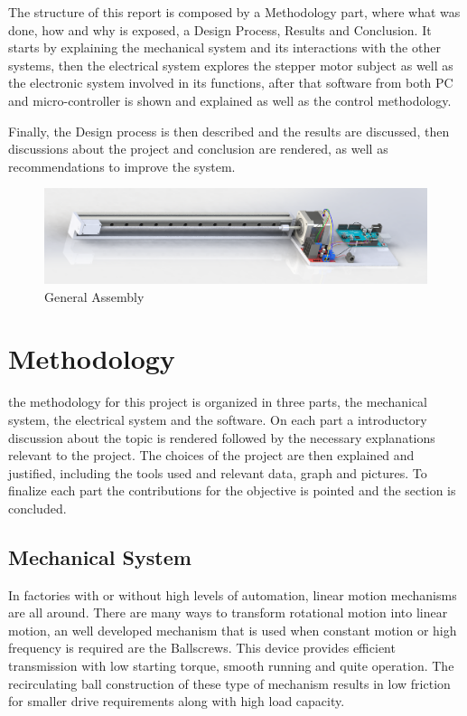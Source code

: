 \documentclass[transmag]{IEEEtran}
\begin{document}
The structure of this report is composed by a Methodology part, where what was done, how and why is exposed, a Design Process, Results and Conclusion. It starts by explaining the mechanical system and its interactions with the other systems, then the electrical system explores the stepper motor subject as well as the electronic system involved in its functions, after that software from both PC and micro-controller is shown and explained as well as the control methodology. 

Finally, the Design process is then described and the results are discussed, then discussions about the project and conclusion are rendered, as well as recommendations to improve the system.

 
\begin{figure}[h]
\centerline{\includegraphics[width=7in]{./images/ASS4-Assembly}}
\caption{General Assembly\label{ASS4-Assembly}}
\end{figure}

\section{Methodology}

the methodology for this project is organized in three parts, the mechanical system, the electrical system and the software. On each part a introductory discussion about the topic is rendered followed by the necessary explanations relevant to the project. The choices of the project are then explained and justified, including the tools used and relevant data, graph and pictures.
To finalize each part the contributions for the objective is pointed and the section is concluded.


\subsection{Mechanical System}

In factories with or without high levels of automation, linear motion mechanisms are all around. There are many ways to transform rotational motion into linear motion, an well developed mechanism that is used when constant motion or high frequency is required are the Ballscrews. This device provides efficient transmission with low starting torque, smooth running and quite operation. The recirculating ball construction of these type of mechanism results in low friction for smaller drive requirements along with high load capacity. \cite{ref1}
\end{document}
